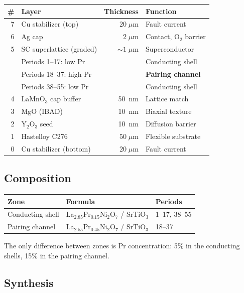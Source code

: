 \documentclass[11pt, a4paper]{article}
\begin{document}
\begin{center}
\begin{tabular}{@{}rp{5cm}rl@{}}
\toprule
\textbf{\#} & \textbf{Layer} & \textbf{Thickness} & \textbf{Function} \\
\midrule
7 & Cu stabilizer (top) & $20\;\mu$m & Fault current \\
6 & Ag cap & $2\;\mu$m & Contact, O$_2$ barrier \\
5 & SC superlattice (graded) & $\sim 1\;\mu$m & Superconductor \\
  & \quad Periods 1--17: low Pr & & Conducting shell \\
  & \quad Periods 18--37: high Pr & & \textbf{Pairing channel} \\
  & \quad Periods 38--55: low Pr & & Conducting shell \\
4 & LaMnO$_3$ cap buffer & 50~nm & Lattice match \\
3 & MgO (IBAD) & 10~nm & Biaxial texture \\
2 & Y$_2$O$_3$ seed & 10~nm & Diffusion barrier \\
1 & Hastelloy C276 & $50\;\mu$m & Flexible substrate \\
0 & Cu stabilizer (bottom) & $20\;\mu$m & Fault current \\
\bottomrule
\end{tabular}
\end{center}

\subsection{Composition}

\begin{center}
\begin{tabular}{@{}lll@{}}
\toprule
\textbf{Zone} & \textbf{Formula} & \textbf{Periods} \\
\midrule
Conducting shell & La$_{2.85}$Pr$_{0.15}$Ni$_2$O$_7$ / SrTiO$_3$ & 1--17, 38--55 \\
Pairing channel & La$_{2.55}$Pr$_{0.45}$Ni$_2$O$_7$ / SrTiO$_3$ & 18--37 \\
\bottomrule
\end{tabular}
\end{center}

The only difference between zones is Pr concentration: 5\% in the
conducting shells, 15\% in the pairing channel.

\subsection{Synthesis}
\end{document}
